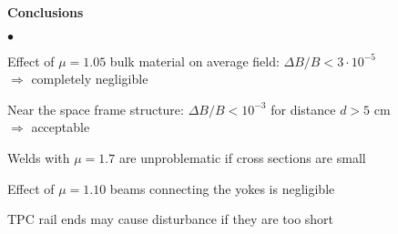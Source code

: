 \documentclass{slides}
\begin{document}
\begin{center}
{\large\bf Conclusions}
\end{center}

\begin{list}
{$\bullet$}{\topsep=10pt\itemsep=0pt\parsep=5pt\leftmargin=25pt%
  }

\item Effect of $\mu = 1.05$ bulk material on average field: 
$\Delta B/B < 3\cdot 10^{-5}$\\
{\blue $\Rightarrow$ completely negligible}

\item Near the space frame structure: $\Delta B/B < 
10^{-3}$ for distance $d>5$ cm\\ {\blue $\Rightarrow$ acceptable}

\item Welds with $\mu = 1.7$ are unproblematic if cross sections are
small 

\item Effect of $\mu = 1.10$ beams connecting the yokes is negligible 
 
\item TPC rail ends may cause disturbance if they are too short


\end{list}
\vfill
\end{document}
